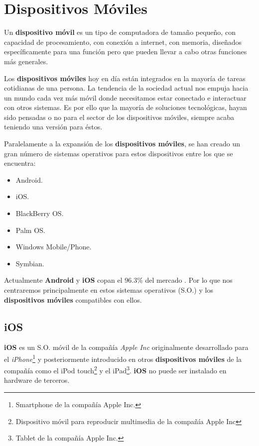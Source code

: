 \newpage

\section{Dispositivos Móviles}

Un \textbf{dispositivo móvil} es un tipo de computadora de tamaño pequeño, con capacidad de procesamiento, con conexión a internet, con memoria, diseñados específicamente para una función pero que pueden llevar a cabo otras funciones más generales.

\bigskip
Los \textbf{dispositivos móviles} hoy en día están integrados en la mayoría de tareas cotidianas de una persona. La tendencia de la sociedad actual nos empuja hacia un mundo cada vez más móvil donde necesitamos estar conectado e interactuar con otros sistemas. Es por ello que la mayoría de soluciones tecnológicas, hayan sido pensadas o no para el sector de los dispositivos móviles, siempre acaba teniendo una versión para éstos.

\bigskip
Paralelamente a la expansión de los \textbf{dispositivos móviles}, se han creado un gran número de sistemas operativos para estos dispositivos entre los que se encuentra:

\begin{itemize}
  \item Android.
  \item iOS.
  \item BlackBerry OS.
  \item Palm OS.
  \item Windows Mobile/Phone.
  \item Symbian.
\end{itemize}

\bigskip
Actualmente \textbf{Android} y \textbf{iOS} copan el 96.3\% del mercado\cite{IDZATF} . Por lo que nos centraremos principalmente en estos sistemas operativos (S.O.) y los \textbf{dispositivos móviles} compatibles con ellos.

\subsection{iOS}

\textbf{iOS} es un S.O. móvil de la compañía \textit{Apple Inc} originalmente desarrollado para el \textit{iPhone}\footnote{Smartphone de la compañía Apple Inc.} y posteriormente introducido en otros \textbf{dispositivos móviles} de la compañía como el iPod touch\footnote{Dispositivo móvil para reproducir multimedia de la compañía Apple Inc} y el iPad\footnote{Tablet de la compañía Apple Inc.}. \textbf{iOS} no puede ser instalado en hardware de terceros.

